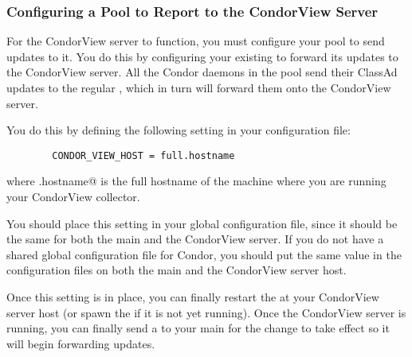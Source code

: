 \subsubsection{\label{sec:CondorView-Pool-Setup}
Configuring a Pool to Report to the CondorView Server} 

For the CondorView server to function, you must configure your pool to
send updates to it.
You do this by configuring your existing  to forward
its updates to the CondorView server.
All the Condor daemons in the pool send their ClassAd updates to the
regular , which in turn will forward them onto the
CondorView server.

You do this by defining the following setting in your configuration
file:
\begin{verbatim}
        CONDOR_VIEW_HOST = full.hostname
\end{verbatim}
where \verb@full.hostname@ is the full hostname of the machine where you
are running your CondorView collector.

You should place this setting in your global configuration file, since
it should be the same for both the main  and the
CondorView server.
If you do not have a shared global configuration file for Condor, you
should put the same value in the configuration files on both the main
 and the CondorView server host.

Once this setting is in place, you can finally restart the
 at your CondorView server host (or spawn the
 if it is not yet running).
Once the CondorView server is running, you can finally send a
 to your main  for the change to
take effect so it will begin forwarding updates.

